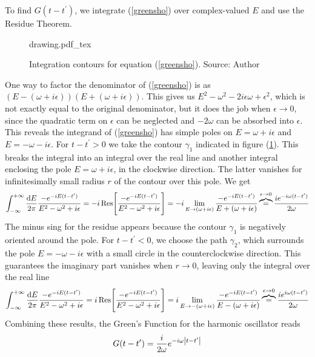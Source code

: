 To find $G(t-t^\prime)$, we integrate (\ref{greensho}) over complex-valued $E$ and use the Residue Theorem.
\begin{figure}[hb]
\centering
   \def\svgwidth{\columnwidth}
   {drawing.pdf_tex}
   \caption{Integration contours for equation (\ref{greensho}). Source: Author}
   \label{contours}
\end{figure}
One way to factor the denominator of (\ref{greensho}) is as $(E-(\omega+i\epsilon))(E+(\omega+i\epsilon))$. This gives us $E^2-\omega^2-2i\epsilon\omega+\epsilon^2$, which is not exactly equal to the original denominator, but it does the job when $\epsilon\to0$, since the quadratic term on $\epsilon$ can be neglected and $-2\omega$ can be absorbed into $\epsilon$. This reveals the integrand of (\ref{greensho}) has simple poles on $E=\omega+i\epsilon$ and $E=-\omega-i\epsilon$.
For $t-t^\prime>0$ we take the contour $\gamma_1$ indicated in figure (\ref{contours}). This breaks the integral into an integral over the real line and another integral enclosing the pole $E=\omega+i\epsilon$, in the clockwise direction. The latter vanishes for infinitesimally small radius $r$ of the contour over this pole. We get 
\begin{equation}
    \int_{-\infty}^{+\infty}\frac{\dd E}{2\pi}\frac{-e^{-iE(t-t^\prime)}}{E^2-\omega^2+i\epsilon}=-i\Res[\frac{-e^{-iE(t-t^\prime)}}{E^2-\omega^2+i\epsilon}]=-i\lim_{E\to(\omega+i\epsilon)}\frac{-e^{-iE(t-t^\prime)}}{E+(\omega+i\epsilon)}\overbrace{=}^{\epsilon\to0}\frac{ie^{-i\omega(t-t^\prime)}}{2\omega}
\end{equation}
The minus sing for the residue appears because the contour $\gamma_1$ is negatively oriented around the pole. For $t-t^\prime<0$, we choose the path $\gamma_2$, which surrounds the pole $E=-\omega-i\epsilon$ with a small circle in the counterclockwise direction. This guarantees the imaginary part vanishes when $r\to0$, leaving only the integral over the real line
\begin{equation}
    \int_{-\infty}^{+\infty}\frac{\dd E}{2\pi}\frac{-e^{-iE(t-t^\prime)}}{E^2-\omega^2+i\epsilon}=i\Res[\frac{-e^{-iE(t-t^\prime)}}{E^2-\omega^2+i\epsilon}]=i\lim_{E\to-(\omega+i\epsilon)}\frac{-e^{-iE(t-t^\prime)}}{E-(\omega+i\epsilon)}\overbrace{=}^{\epsilon\to0}\frac{ie^{i\omega(t-t^\prime)}}{2\omega}
\end{equation}
Combining these results, the Green's Function for the harmonic oscillator reads
\begin{equation}
    G(t-t^\prime)=\frac{i}{2\omega}e^{-i\omega \abs{t-t^\prime}}
    \label{greensho2}
\end{equation}

